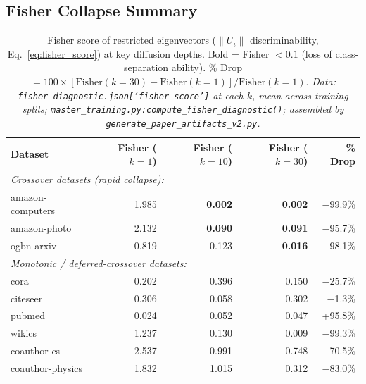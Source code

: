 \documentclass[11pt]{article}
\begin{document}
\subsection{Fisher Collapse Summary}

\begin{table}[H]
\centering
\caption{Fisher score of restricted eigenvectors ($\|U_i\|$ discriminability,
Eq.~\ref{eq:fisher_score}) at key diffusion depths.
Bold = Fisher $< 0.1$ (loss of class-separation ability).
\% Drop $= 100\times[\mathrm{Fisher}(k{=}30) - \mathrm{Fisher}(k{=}1)] / \mathrm{Fisher}(k{=}1)$.
\textit{\scriptsize Data: \texttt{fisher\_diagnostic.json[`fisher\_score']} at each $k$,
mean across training splits;
\texttt{master\_training.py:compute\_fisher\_diagnostic()};
assembled by \texttt{generate\_paper\_artifacts\_v2.py}.}}
\label{tab:fisher_collapse}
\begin{tabular}{lrrrr}
\toprule
Dataset & Fisher ($k{=}1$) & Fisher ($k{=}10$) & Fisher ($k{=}30$) & \% Drop \\
\midrule
\multicolumn{5}{l}{\textit{Crossover datasets (rapid collapse):}} \\
amazon-computers & 1.985 & \textbf{0.002} & \textbf{0.002} & $-$99.9\% \\
amazon-photo     & 2.132 & \textbf{0.090} & \textbf{0.091} & $-$95.7\% \\
ogbn-arxiv       & 0.819 & 0.123          & \textbf{0.016} & $-$98.1\% \\
\midrule
\multicolumn{5}{l}{\textit{Monotonic / deferred-crossover datasets:}} \\
cora             & 0.202 & 0.396          & 0.150 & $-$25.7\% \\
citeseer         & 0.306 & 0.058          & 0.302 & $-$1.3\%  \\
pubmed           & 0.024 & 0.052          & 0.047 & +95.8\%   \\
wikics           & 1.237 & 0.130          & 0.009 & $-$99.3\% \\
coauthor-cs      & 2.537 & 0.991          & 0.748 & $-$70.5\% \\
coauthor-physics & 1.832 & 1.015          & 0.312 & $-$83.0\% \\
\bottomrule
\end{tabular}
\end{table}
\end{document}
